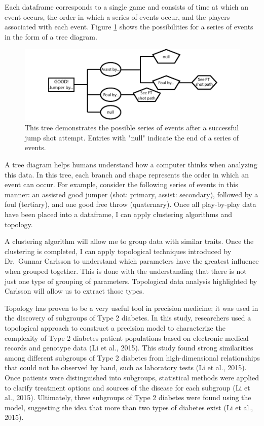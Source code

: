 \documentclass[12pt, letterpaper]{article}
\begin{document}
Each dataframe corresponds to a single game and consists of time at which an event occurs, the order in which a series of events occur, and the players associated with each event. Figure \ref{f: tree} shows the possibilities for a series of events in the form of a tree diagram.

\begin{figure}[h]
\begin{center}
\includegraphics{good_jumper_pbp_final.pdf}
\caption{This tree demonstrates the possible series of events after a successful jump shot attempt. Entries with "null" indicate the end of a series of events.}
\label{f: tree}
\end{center}
\end{figure}
\vspace{-23pt}
A tree diagram helps humans understand how a computer thinks when analyzing this data. In this tree, each branch and shape represents the order in which an event can occur. For example, consider the following series of events in this manner: an assisted good jumper (shot: primary, assist: secondary), followed by a foul (tertiary), and one good free throw (quaternary). Once all play-by-play data have been placed into a dataframe, I can apply clustering algorithms and topology.

A clustering algorithm will allow me to group data with similar traits. Once the clustering is completed, I can apply topological techniques introduced by Dr.~Gunnar Carlsson to understand which parameters have the greatest influence when grouped together. This is done with the understanding that there is not just one type of grouping of parameters. Topological data analysis highlighted by Carlsson will allow us to extract those types.

Topology has proven to be a very useful tool in precision medicine; it was used in the discovery of subgroups of Type 2 diabetes. In this study, researchers used a topological approach to construct a precision model to characterize the complexity of Type 2 diabetes patient populations based on electronic medical records and genotype data (Li et al., 2015). This study found strong similarities among different subgroups of Type 2 diabetes from high-dimensional relationships that could not be observed by hand, such as laboratory tests (Li et al., 2015). Once patients were distinguished into subgroups, statistical methods were applied to clarify treatment options and sources of the disease for each subgroup (Li et al., 2015). Ultimately, three subgroups of Type 2 diabetes were found using the model, suggesting the idea that more than two types of diabetes exist (Li et al., 2015).
\end{document}
